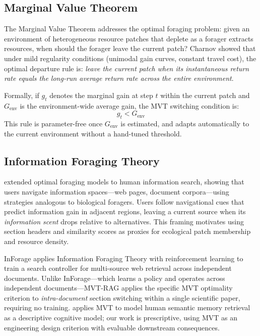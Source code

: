 \documentclass[11pt,letterpaper]{article}
\begin{document}
\subsection{Marginal Value Theorem}

The Marginal Value Theorem \citep{Charnov1976} addresses the optimal foraging problem: given an environment of
heterogeneous resource patches that deplete as a forager extracts resources, when should the forager leave the current
patch? Charnov showed that under mild regularity conditions (unimodal gain curves, constant travel cost), the optimal
departure rule is: \emph{leave the current patch when its instantaneous return rate equals the long-run average return
rate across the entire environment}.

Formally, if $g_t$ denotes the marginal gain at step $t$ within the current patch and $G_{\mathrm{env}}$ is the
environment-wide average gain, the MVT switching condition is:
\begin{equation}
  g_t < G_{\mathrm{env}}
\end{equation}
This rule is parameter-free once $G_{\mathrm{env}}$ is estimated, and adapts automatically to the current environment
without a hand-tuned threshold.

\subsection{Information Foraging Theory}

\citet{Pirolli2007} extended optimal foraging models to human information search, showing that users navigate information
spaces---web pages, document corpora---using strategies analogous to biological foragers. Users follow navigational cues
that predict information gain in adjacent regions, leaving a current source when its \emph{information scent} drops
relative to alternatives. This framing motivates using section headers and similarity scores as proxies for ecological
patch membership and resource density.

InForage \citep{Qian2025} applies Information Foraging Theory with reinforcement learning to train a search controller
for multi-source web retrieval across independent documents. Unlike InForage---which learns a policy and operates across
independent documents---MVT-RAG applies the specific MVT optimality criterion to \emph{intra-document} section switching
within a single scientific paper, requiring no training. \citet{Moore2025} applies MVT to model human semantic memory
retrieval as a descriptive cognitive model; our work is prescriptive, using MVT as an engineering design criterion with
evaluable downstream consequences.
\end{document}
